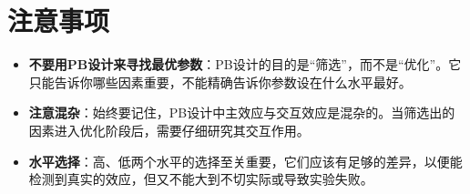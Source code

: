 \documentclass[fontset=windows,12pt]{ctexart}
\begin{document}
\section{注意事项}

\begin{itemize}
	\item \textbf{不要用PB设计来寻找最优参数}：PB设计的目的是“筛选”，而不是“优化”。它只能告诉你哪些因素重要，不能精确告诉你参数设在什么水平最好。
	\item \textbf{注意混杂}：始终要记住，PB设计中主效应与交互效应是混杂的。当筛选出的因素进入优化阶段后，需要仔细研究其交互作用。
	\item \textbf{水平选择}：高、低两个水平的选择至关重要，它们应该有足够的差异，以便能检测到真实的效应，但又不能大到不切实际或导致实验失败。
\end{itemize}
\end{document}

